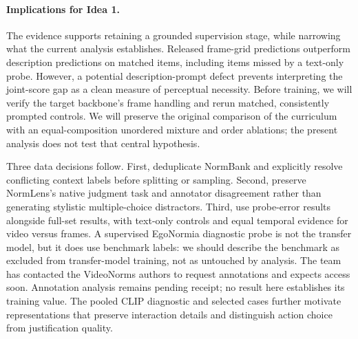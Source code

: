 \paragraph{Implications for Idea 1.}
The evidence supports retaining a grounded supervision stage, while narrowing what the current analysis establishes. Released frame-grid predictions outperform description predictions on matched items, including items missed by a text-only probe. However, a potential description-prompt defect prevents interpreting the joint-score gap as a clean measure of perceptual necessity. Before training, we will verify the target backbone's frame handling and rerun matched, consistently prompted controls. We will preserve the original comparison of the curriculum with an equal-composition unordered mixture and order ablations; the present analysis does not test that central hypothesis.

Three data decisions follow. First, deduplicate NormBank and explicitly resolve conflicting context labels before splitting or sampling. Second, preserve NormLens's native judgment task and annotator disagreement rather than generating stylistic multiple-choice distractors. Third, use probe-error results alongside full-set results, with text-only controls and equal temporal evidence for video versus frames. A supervised EgoNormia diagnostic probe is not the transfer model, but it does use benchmark labels: we should describe the benchmark as excluded from transfer-model training, not as untouched by analysis. The team has contacted the VideoNorms authors to request annotations and expects access soon. Annotation analysis remains pending receipt; no result here establishes its training value. The pooled CLIP diagnostic and selected cases further motivate representations that preserve interaction details and distinguish action choice from justification quality.

